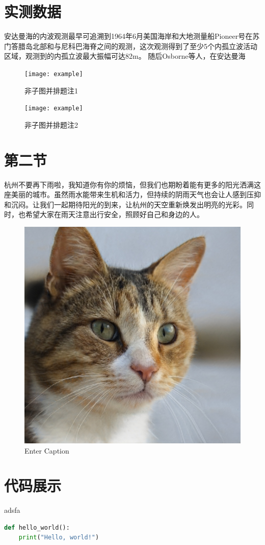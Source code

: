 \documentclass[10.5pt,compsoc,UTF8]{CjC}
\begin{document}
\section{实测数据}
安达曼海的内波观测最早可追溯到1964年6月美国海岸和大地测量船Pioneer号在苏门答腊岛北部和与尼科巴海脊之间的观测，这次观测得到了至少5个内孤立波活动区域，观测到的内孤立波最大振幅可达82m。
随后Osborne等人，在安达曼海
\begin{figure}[!htbp]
    \centering
    \begin{minipage}[b]{0.45\linewidth}
        \centering
        \texttt{[image: example]}
        \caption{非子图并排题注1}
         
    \end{minipage}%
    \begin{minipage}[b]{0.45\linewidth}
        \centering
        \texttt{[image: example]}
        \caption{非子图并排题注2}
         
    \end{minipage}
\end{figure}


\section{第二节}


\zhlipsum[5] %

杭州不要再下雨啦，我知道你有你的烦恼，但我们也期盼着能有更多的阳光洒满这座美丽的城市。虽然雨水能带来生机和活力，但持续的阴雨天气也会让人感到压抑和沉闷。让我们一起期待阳光的到来，让杭州的天空重新焕发出明亮的光彩。同时，也希望大家在雨天注意出行安全，照顾好自己和身边的人。

\begin{figure}
    \centering
    \includegraphics[width=0.5\linewidth]{figures/example.png}
    \caption{Enter Caption}
    \label{fig:enter-label}
\end{figure}


\newpage
\section{代码展示}
\begin{problem}
adsfa
\end{problem}
\begin{solution}
\end{solution}
\begin{lstlisting}[language=Python, caption=Python example]
def hello_world():
    print("Hello, world!")
\end{lstlisting}


\clearpage
{}
\end{document}
